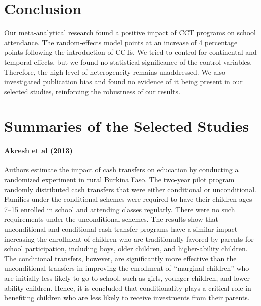 \documentclass[a4paper, 10pt]{article}
\begin{document}
\section{Conclusion} \label{sec:conclusion}
Our meta-analytical research found a positive impact of CCT programs on school attendance. The random-effects model points at an increase of 4 percentage points following the introduction of CCTs. We tried to control for continental and temporal effects, but we found no statistical significance of the control variables. Therefore, the high level of heterogeneity remains unaddressed. We also investigated publication bias and found no evidence of it being present in our selected studies, reinforcing the robustness of our results.

\clearpage

\nocite{*}




\newpage

\appendix
\section*{Summaries of the Selected Studies}

\paragraph{Akresh et al (2013)}

Authors estimate the impact of cash transfers on education by conducting a randomized experiment in rural Burkina Faso. The two-year pilot program randomly distributed cash transfers that were either conditional or unconditional. Families under the conditional schemes were required to have their children ages 7–15 enrolled in school and attending classes regularly. There were no such requirements under the unconditional schemes. The results show that unconditional and conditional cash transfer programs have a similar impact increasing the enrollment of children who are traditionally favored by parents for school participation, including boys, older children, and higher-ability children. The conditional transfers, however, are significantly more effective than the unconditional transfers in improving the enrollment of ``marginal children'' who are initially less likely to go to school, such as girls, younger children, and lower-ability children. Hence, it is concluded that conditionality plays a critical role in benefiting children who are less likely to receive investments from their parents.
\end{document}
